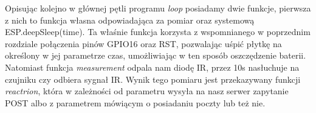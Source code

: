 Opisując kolejno w głównej pętli programu \textit{loop} posiadamy dwie funkcje, pierwsza z nich to funkcja własna odpowiadająca za pomiar oraz systemową ESP.deepSleep(time). Ta właśnie funkcja korzysta z wspomnianego w poprzednim rozdziale połączenia pinów GPIO16 oraz RST, pozwalając uśpić 
płytkę na określony w jej parametrze czas, umożliwiając w ten sposób oszczędzenie baterii. Natomiast funkcja \textit{measurement} odpala nam diodę IR, przez 10s nasłuchuje na czujniku czy odbiera sygnał IR. Wynik tego pomiaru jest przekazywany funkcji \textit{reactrion}, która w zależności od parametru wysyła na nasz serwer zapytanie POST albo z parametrem mówiącym o posiadaniu poczty lub też nie.
